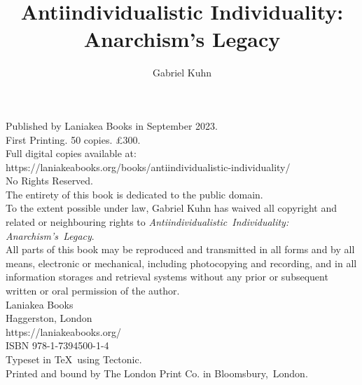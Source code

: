 \documentclass{book}
\title{Antiindividualistic Individuality: Anarchism’s Legacy}
\author{Gabriel Kuhn}
\date{}
\begin{document}
\frontmatter %
\pagestyle{empty} %

\maketitle

\vspace*{\fill}
\begin{center}
{
    \small
    Published by Laniakea Books in September 2023.\\
    \vspace{1em}
    First Printing. 50 copies. £300.\\
    \vspace{1em}
    Full digital copies available at:\\
    \mbox{https://laniakeabooks.org/books/antiindividualistic-individuality/}\\
    \vspace{1em}
    No Rights Reserved.\\
    \vspace{1em}
    The entirety of this book is dedicated to the public domain.\\
    \vspace{1em}
    To the extent possible under law, Gabriel Kuhn has waived all copyright and
    related or neighbouring rights to \textit{Antiindividualistic~Individuality: Anarchism’s~Legacy}.\\
    \vspace{1em}
    All parts of this book may be reproduced and transmitted in all forms and by
    all means, electronic or mechanical, including photocopying and recording,
    and in all information storages and retrieval systems without any prior or
    subsequent written or oral permission of the author.\\
    \vspace{1em}
    Laniakea Books\\
    Haggerston, London\\
    https://laniakeabooks.org/\\
    \vspace{1em}
    ISBN 978-1-7394500-1-4\\
    \vspace{1em}
    Typeset in \TeX\ using Tectonic.\\
    Printed and bound by The London Print Co. in Bloomsbury,~London.
}
\end{center}

\mainmatter %
\pagestyle{fancy} %
\end{document}
